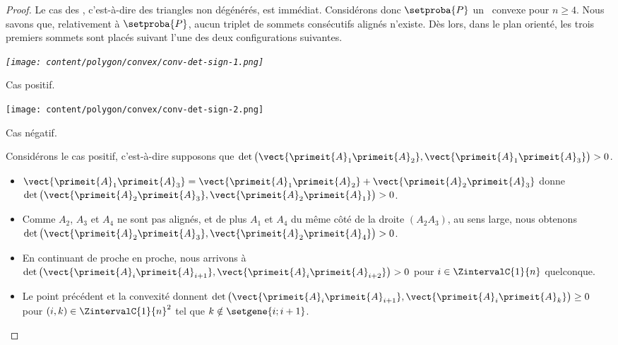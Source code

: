 \begin{proof}
	Le cas des , c'est-à-dire des triangles non dégénérés, est immédiat.
	Considérons donc $\setproba{P}$ un \ngone\ convexe pour $n \geq 4$.
	Nous savons que, relativement à $\setproba{P}$, aucun triplet de sommets consécutifs alignés n'existe.
	Dès lors, dans le plan orienté, les trois premiers sommets sont placés suivant l'une des deux configurations suivantes. 
    
    \begin{multicols}{2}
        \small\itshape\centering
       	\texttt{[image: content/polygon/convex/conv-det-sign-1.png]}
    	    
    	\smallskip
        Cas positif.
        
        \texttt{[image: content/polygon/convex/conv-det-sign-2.png]}
    	    
    	\smallskip
        Cas négatif.
    \end{multicols}

    


    \noindent
    Considérons le cas positif, c'est-à-dire supposons que 
    $\det \big( \vect{\primeit{A}_1 \primeit{A}_2}, \vect{\primeit{A}_1 \primeit{A}_3} \big) > 0$.
	\begin{itemize}
    	\item $\vect{\primeit{A}_1 \primeit{A}_3} = \vect{\primeit{A}_1 \primeit{A}_2} + \vect{\primeit{A}_2 \primeit{A}_3}$
    	donne
		$\det \big( \vect{\primeit{A}_2 \primeit{A}_3}, \vect{\primeit{A}_2 \primeit{A}_1} \big) > 0$.


		\item Comme $A_2$, $A_3$ et $A_4$ ne sont pas alignés, et de plus $A_1$ et $A_4$ du même côté de la droite $(A_2 A_3)$, au sens large, nous obtenons
		$\det \big( \vect{\primeit{A}_2 \primeit{A}_3}, \vect{\primeit{A}_2 \primeit{A}_4} \big) > 0$.


		\item En continuant de proche en proche, nous arrivons à
		$\det \big( \vect{\primeit{A}_i \primeit{A}_{i+1}}, \vect{\primeit{A}_i \primeit{A}_{i+2}} \big) > 0$
		pour $i \in \ZintervalC{1}{n}$ quelconque.


		\item Le point précédent et la convexité donnent
		$\det \big( \vect{\primeit{A}_i \primeit{A}_{i+1}}, \vect{\primeit{A}_i \primeit{A}_k} \big) \geq 0$
		pour $(i, k) \in \ZintervalC{1}{n}^2$ tel que $k \notin \setgene{i ; i+1}$.



\end{itemize}
\end{proof}
